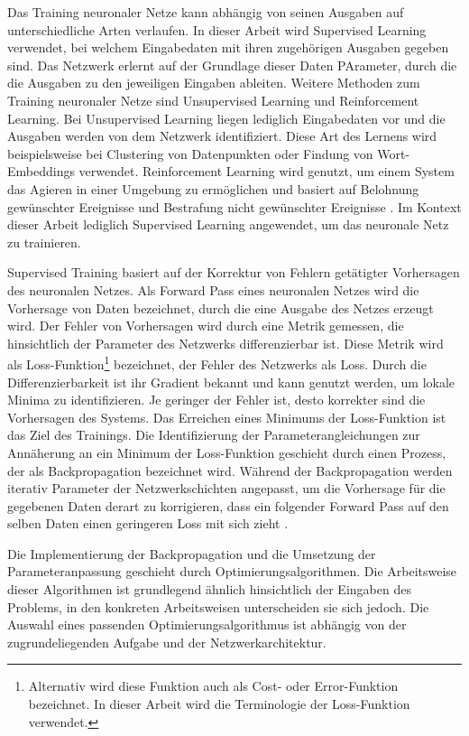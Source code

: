 Das Training neuronaler Netze kann abhängig von seinen Ausgaben auf unterschiedliche Arten verlaufen. In dieser Arbeit wird Supervised Learning verwendet, bei welchem Eingabedaten mit ihren zugehörigen Ausgaben gegeben sind. Das Netzwerk erlernt auf der Grundlage dieser Daten PArameter, durch die die Ausgaben zu den jeweiligen Eingaben ableiten. Weitere Methoden zum Training neuronaler Netze sind Unsupervised Learning und Reinforcement Learning. Bei Unsupervised Learning liegen lediglich Eingabedaten vor und die Ausgaben werden von dem Netzwerk identifiziert. Diese Art des Lernens wird beispielsweise bei Clustering von Datenpunkten oder Findung von Wort-Embeddings verwendet. Reinforcement Learning wird genutzt, um einem System das Agieren in einer Umgebung zu ermöglichen und basiert auf Belohnung gewünschter Ereignisse und Bestrafung nicht gewünschter Ereignisse \cite{nn_terminology}. Im Kontext dieser Arbeit lediglich Supervised Learning angewendet, um das neuronale Netz zu trainieren.

Supervised Training basiert auf der Korrektur von Fehlern getätigter Vorhersagen des neuronalen Netzes. Als Forward Pass eines neuronalen Netzes wird die Vorhersage von Daten bezeichnet, durch die eine Ausgabe des Netzes erzeugt wird. Der Fehler von Vorhersagen wird durch eine Metrik gemessen, die hinsichtlich der Parameter des Netzwerks differenzierbar ist. Diese Metrik wird als Loss-Funktion\footnote{Alternativ wird diese Funktion auch als Cost- oder Error-Funktion bezeichnet. In dieser Arbeit wird die Terminologie der Loss-Funktion verwendet.} bezeichnet, der Fehler des Netzwerks als Loss. Durch die Differenzierbarkeit ist ihr Gradient bekannt und kann genutzt werden, um lokale Minima zu identifizieren. Je geringer der Fehler ist, desto korrekter sind die Vorhersagen des Systems. Das Erreichen eines Minimums der Loss-Funktion ist das Ziel des Trainings. Die Identifizierung der Parameterangleichungen zur Annäherung an ein Minimum der Loss-Funktion geschieht durch einen Prozess, der als Backpropagation bezeichnet wird. Während der Backpropagation werden iterativ Parameter der Netzwerkschichten angepasst, um die Vorhersage für die gegebenen Daten derart zu korrigieren, dass ein folgender Forward Pass auf den selben Daten einen geringeren Loss mit sich zieht \cite{cv_general}.

Die Implementierung der Backpropagation und die Umsetzung der Parameteranpassung geschieht durch Optimierungsalgorithmen. Die Arbeitsweise dieser Algorithmen ist grundlegend ähnlich hinsichtlich der Eingaben des Problems, in den konkreten Arbeitsweisen unterscheiden sie sich jedoch. Die Auswahl eines passenden Optimierungsalgorithmus ist abhängig von der zugrundeliegenden Aufgabe und der Netzwerkarchitektur.

